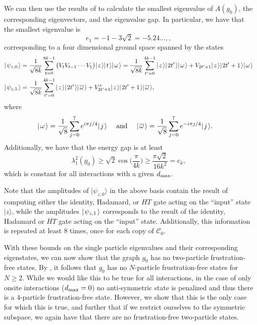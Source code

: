 \documentclass[../thesis-main/thesis-main]{subfiles}
\begin{document}
We can then use the results of  to calculate the smallest eigenvalue of $A(g_0)$, the corresponding eigenvectors, and the eigenvalue gap.  In particular, we have that the smallest eigenvalue is 
\begin{equation}
  e_1 = -1 - 3 \sqrt{2} = -5.24\ldots, \label{eq:e_1},
\end{equation}
corresponding to a four dimensional ground space spanned by the states
\begin{align}
  |\mspace{2mu} \psi_{z,0} \mspace{2mu} \rangle &= \frac{1}{\sqrt{8k}}\sum_{t=0}^{8k-1} \big(V_t V_{t-1} \cdots V_1\big) |\mspace{2mu} z \mspace{2mu} \rangle |\mspace{2mu} t \mspace{2mu} \rangle |\mspace{2mu} \omega \mspace{2mu} \rangle= \frac{1}{\sqrt{8k}}\sum_{t'=0}^{4k-1} |\mspace{2mu} z \mspace{2mu} \rangle |\mspace{2mu} 2t' \mspace{2mu} \rangle|\mspace{2mu} \omega \mspace{2mu} \rangle + V_{2t' + 1} |\mspace{2mu} z \mspace{2mu} \rangle |\mspace{2mu} 2t'+1 \mspace{2mu} \rangle|\mspace{2mu} \omega \mspace{2mu} \rangle\label{eq:psi0m}\\
  |\mspace{2mu} \psi_{z,1} \mspace{2mu} \rangle &= \frac{1}{\sqrt{8k}} \sum_{t'=0}^{4k-1} |\mspace{2mu} z \mspace{2mu} \rangle|\mspace{2mu} 2t' \mspace{2mu} \rangle |\mspace{2mu} \overline{\omega} \mspace{2mu} \rangle + V_{2t'+1}^* |\mspace{2mu} z \mspace{2mu} \rangle |\mspace{2mu} 2t'+1 \mspace{2mu} \rangle |\mspace{2mu} \overline{\omega} \mspace{2mu} \rangle\label{eq:psi1m},
\end{align}
where
\begin{align}
  |\mspace{2mu} \omega \mspace{2mu} \rangle &= \frac{1}{\sqrt{8}} \sum_{j=0}^{7} e^{i \pi j/4} |\mspace{2mu} j \mspace{2mu} \rangle &\text{ and } &&
  |\mspace{2mu} \overline{\omega} \mspace{2mu} \rangle &= \frac{1}{\sqrt{8}} \sum_{j=0}^7 e^{-i \pi j/4} |\mspace{2mu} j \mspace{2mu} \rangle.
\end{align}
Additionally, we have that the energy gap is at least 
\begin{equation}
  \lambda_1^2(g_0) \geq \sqrt{2} \cos\Big(\frac{\pi}{4k}\Big) \geq \frac{\pi\sqrt{2}}{16 k^2} = c_k,
\end{equation}
which is constant for all interactions with a given $d_{\text{max}}$.



Note that the amplitudes of $|\psi_{z,0}\rangle$ in the above basis contain the result of computing either the identity, Hadamard, or $HT$ gate acting on the ``input'' state $|z\rangle$, while the amplitudes $|\mspace{2mu} \psi_{z,1} \mspace{2mu} \rangle$ corresponds to the result of the identity, Hadamard or $\overline{HT}$ gate acting on the ``input'' state.  Additionally, this information is repeated at least $8$ times, once for each copy of $\mathcal{C}_0$.


With these bounds on the single particle eigenvalues and their corresponding eigenstates, we can now show that the graph $g_{0}$ has no two-particle frustration-free states. By , it follows that $g_0$ has no $N$-particle frustration-free states for $N\geq 2$.  While we would like this to be true for all interactions, in the case of only onsite interactions ($d_{\text{max}} =0$) no anti-symmetric state is penalized and thus there is a $4$-particle frustration-free state.  However, we show that this is the only case for which this is true, and further that if we restrict ourselves to the symmetric subspace, we again have that there are no frustration-free two-particle states.
\end{document}
